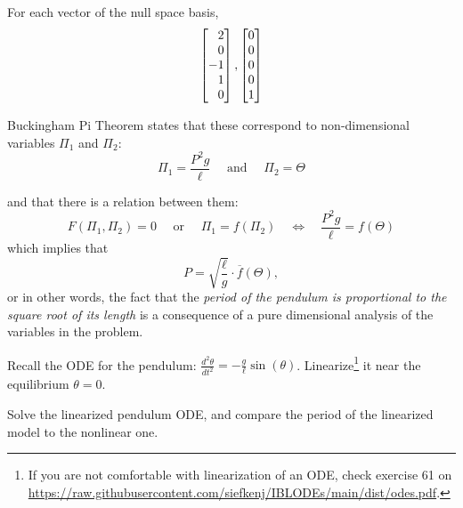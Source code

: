 \begin{slide}

For each vector of the null space basis, 
\[ \mat{2\\0\\-1\\1\\0} , \mat{0\\0\\0\\0\\1} \]

Buckingham Pi Theorem states that these correspond to non-dimensional variables $\Pi_1$ and $\Pi_2$:
\[ \Pi_1 = \frac{P^2 g}{\ell} \quad \text{ and } \quad \Pi_2 = \Theta \]

and that there is a relation between them:
\[
F(\Pi_1,\Pi_2)=0 \quad \text{ or } \quad \Pi_1 = f(\Pi_2) \quad \Leftrightarrow \quad \frac{P^2 g}{\ell} = f(\Theta)
\]
which implies that
\[ 
P = \sqrt{\frac{\ell}{g}} \cdot \overline{f}(\Theta),
\]
or in other words, the fact that the \textit{period of the pendulum is proportional to the square root of its length} is a consequence of a pure dimensional analysis of the variables in the problem.


\begin{parts}
	\setcounter{partsitem}{5}
	\item Recall the ODE for the pendulum: $ \frac{d^2\theta}{dt^2} = -\frac{g}{\ell}\sin (\theta)$. Linearize\footnote{If you are not comfortable with linearization of an ODE, check exercise 61 on \url{https://raw.githubusercontent.com/siefkenj/IBLODEs/main/dist/odes.pdf}.} it near the equilibrium $\theta=0$.
	\item Solve the linearized pendulum ODE, and compare the period of the linearized model to the nonlinear one.
\end{parts}


\end{slide}





